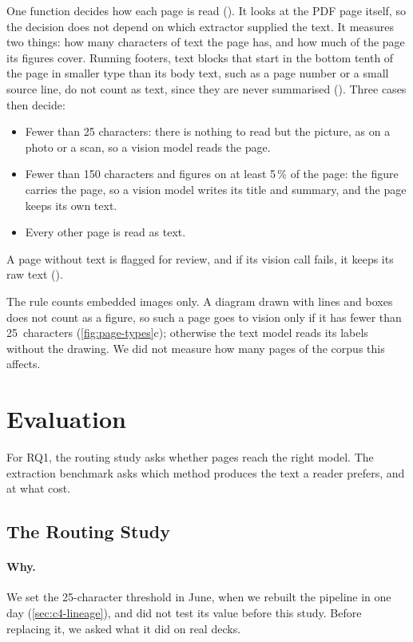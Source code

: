 One function decides how each page is read
(). It looks at the PDF page itself, so the
decision does not depend on which extractor supplied the text. It measures
two things: how many characters of text the page has, and how much of the
page its figures cover. Running footers, text blocks that start in the bottom
tenth of the page in smaller type than its body text, such as a page number or
a small source line, do not count as text, since they are never summarised
(). Three cases then decide:
\begin{itemize}
  \item Fewer than 25 characters: there is nothing to read but the picture, as
    on a photo or a scan, so a vision model reads the page.
  \item Fewer than 150 characters and figures on at least 5\,\% of the page:
    the figure carries the page, so a vision model writes its title and
    summary, and the page keeps its own text.
  \item Every other page is read as text.
\end{itemize}
A page without text is flagged for review, and if its vision call fails, it
keeps its raw text ().

The rule counts embedded images only. A diagram drawn with lines and boxes
does not count as a figure, so such a page goes to vision only if it has fewer
than 25~characters (\cref{fig:page-types}c); otherwise the text model reads
its labels without the drawing. We did not measure how many pages of the
corpus this affects.

\section{Evaluation}
\label{sec:c4-evaluation}

For RQ1, the routing study asks whether pages
reach the right model. The extraction benchmark asks which method produces
the text a reader prefers, and at what cost.

\subsection{The Routing Study}
\label{sec:c4-routing-study}

\paragraph{Why.} We set the 25-character threshold in June, when we rebuilt
the pipeline in one day (\cref{sec:c4-lineage}), and did not test its value
before this study. Before replacing it, we asked what it did on real decks.

